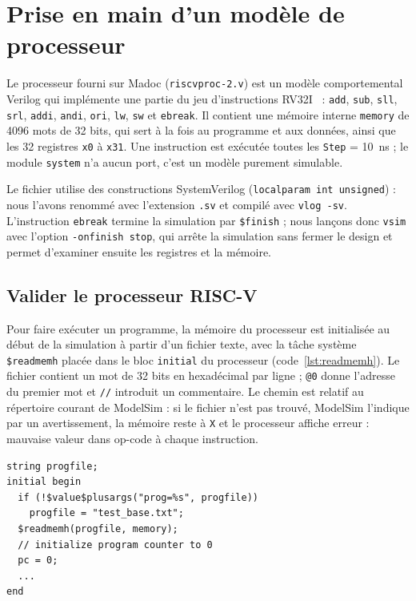 \section{Prise en main d'un modèle de processeur}
\label{sec:processeur}

Le processeur fourni sur Madoc (\texttt{riscvproc-2.v}) est un modèle comportemental Verilog qui
implémente une partie du jeu d'instructions RV32I~\cite{riscvspec} : \texttt{add},
\texttt{sub}, \texttt{sll}, \texttt{srl}, \texttt{addi}, \texttt{andi}, \texttt{ori},
\texttt{lw}, \texttt{sw} et \texttt{ebreak}. Il contient une mémoire interne \texttt{memory} de
4096 mots de 32 bits, qui sert à la fois au programme et aux données, ainsi que les 32 registres
\texttt{x0} à \texttt{x31}. Une instruction est exécutée toutes les \texttt{Step} = 10~ns ; le
module \texttt{system} n'a aucun port, c'est un modèle purement simulable.

Le fichier utilise des constructions SystemVerilog (\texttt{localparam int unsigned}) : nous
l'avons renommé avec l'extension \texttt{.sv} et compilé avec \texttt{vlog -sv}. L'instruction
\texttt{ebreak} termine la simulation par \texttt{\$finish} ; nous lançons donc \texttt{vsim}
avec l'option \texttt{-onfinish stop}, qui arrête la simulation sans fermer le design et permet
d'examiner ensuite les registres et la mémoire.

\subsection{Valider le processeur RISC-V}
\label{sec:validation}

Pour faire exécuter un programme, la mémoire du processeur est initialisée au début de la
simulation à partir d'un fichier texte, avec la tâche système \texttt{\$readmemh} placée dans le
bloc \texttt{initial} du processeur (code~\ref{lst:readmemh}). Le fichier contient un mot de
32 bits en hexadécimal par ligne ; \texttt{@0} donne l'adresse du premier mot et \texttt{//}
introduit un commentaire. Le chemin est relatif au répertoire courant de ModelSim : si le
fichier n'est pas trouvé, ModelSim l'indique par un avertissement, la mémoire reste à
\texttt{X} et le processeur affiche \og erreur : mauvaise valeur dans op-code\fg{} à chaque
instruction.

\noindent\begin{minipage}{\linewidth}
\begin{lstlisting}[style=verilog, caption={Chargement du programme dans la mémoire du processeur}, label={lst:readmemh}]
string progfile;
initial begin
  if (!$value$plusargs("prog=%s", progfile))
    progfile = "test_base.txt";
  $readmemh(progfile, memory);
  // initialize program counter to 0
  pc = 0;
  ...
end
\end{lstlisting}
\end{minipage}\par


